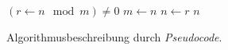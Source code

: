 \begin{figure}
    \centering
    \begin{codebox}
        \li \While $(r \gets n \mod m) \neq 0$
        \li     \Do
                    $m \gets n$                 \label{ln:euclid-while-begin}
        \li         $n \gets r$                 \label{ln:euclid-while-end}
                \End
        \li \Return $n$                         \label{ln:euclid-return}
    \end{codebox}
    \caption{Algorithmusbeschreibung durch \emph{Pseudocode}.}
    \label{fig:pseudocode-algorithm-specification}
\end{figure}